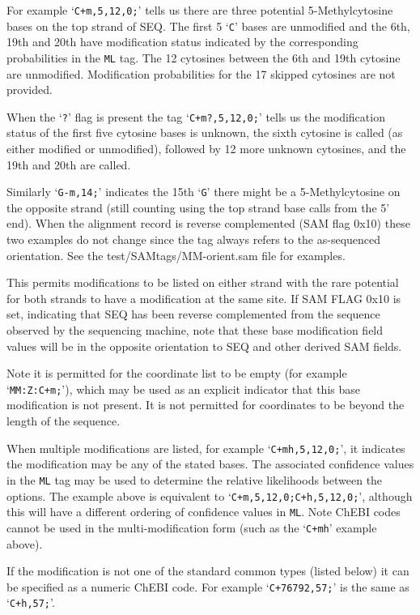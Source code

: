 \documentclass[10pt]{article}
\begin{document}
\begin{description}
For example `{\tt C+m,5,12,0;}' tells us there are three
potential 5-Methylcytosine bases on the top strand of {\sf SEQ}.
The first 5 `{\tt C}' bases are unmodified and the 6th, 19th and 20th have modification status indicated by the corresponding probabilities in the {\tt ML} tag. The 12 cytosines between the 6th and 19th cytosine are unmodified. Modification probabilities for the 17 skipped cytosines are not provided.

When the `{\tt ?}' flag is present the tag `{\tt C+m?,5,12,0;}' tells us the modification status of the first five 
cytosine bases is unknown, the sixth cytosine is called (as either modified or unmodified), followed by 12 more unknown cytosines, and the 19th and 20th are called.

Similarly `{\tt G-m,14;}' indicates the 15th `{\tt G}' there might be a 5-Methylcytosine on the opposite strand (still counting using the top strand base calls from the 5' end).
When the alignment record is reverse complemented (SAM flag 0x10) these two examples do not change since the tag always refers to the as-sequenced orientation.
See the test/SAMtags/MM-orient.sam file for examples.

This permits modifications to be listed on either strand with the rare potential for both strands to have a modification at the same site.
If SAM FLAG 0x10 is set, indicating that SEQ has been reverse complemented from the sequence observed by the sequencing machine, note that these base modification field values will be in the opposite orientation to SEQ and other derived SAM fields.

Note it is permitted for the coordinate list to be empty (for example `{\tt MM:Z:C+m;}'), which may be used as an explicit indicator that this base modification is not present.
It is not permitted for coordinates to be beyond the length of the sequence.

When multiple modifications are listed, for example `{\tt C+mh,5,12,0;}', it indicates the modification may be any of the stated bases.
The associated confidence values in the {\tt ML} tag may be used to determine the relative likelihoods between the options.
The example above is equivalent to `{\tt C+m,5,12,0;C+h,5,12,0;}', although this will have a different ordering of confidence values in {\tt ML}.
Note ChEBI codes cannot be used in the multi-modification form (such as the `{\tt C+mh}' example above).

If the modification is not one of the standard common types (listed below) it can be specified as a numeric ChEBI code.
For example `{\tt C+76792,57;}' is the same as `{\tt C+h,57;}'.


\end{description}
\end{document}
